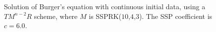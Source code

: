 \begin{figure}[t!]
    \centering
    \caption{Solution of Burger's equation with continuous initial data, using a $ TM^{n-2}R $ scheme, where $ M $ is SSPRK($ 10 $,$ 4 $,$ 3 $). The SSP coefficient is $ c = 6.0 $.}
    \label{fig5.3}
\end{figure}

